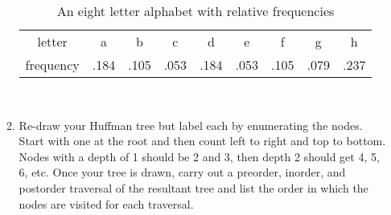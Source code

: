 \documentclass[]{article}
\begin{document}
\begin{enumerate}
\begin{enumerate}
\begin{table}[!htpb]
\begin{center}
\begin{tabular}{ccccccccc}
letter    & a & b & c & d &  e & f & g & h \\
frequency & .184 & .105 & .053 & .184 & .053 & .105 & .079 & .237 
\end{tabular}
\end{center}
\caption{An eight letter alphabet with relative frequencies}
\label{tab:freq}
\end{table}

\newpage \thispagestyle{empty}
\mbox{ }
\newpage \thispagestyle{empty}

\item Re-draw your Huffman tree but label each by enumerating the nodes. Start with one at the root and then count left to right and top to bottom. Nodes with a depth of 1 should be 2 and 3, then depth 2 should get 4, 5, 6, etc. Once your tree is drawn, carry out a preorder, inorder, and postorder traversal of the resultant tree and list the order in which the nodes are visited for each traversal. 

\end{enumerate}

\end{enumerate}
\end{document}
